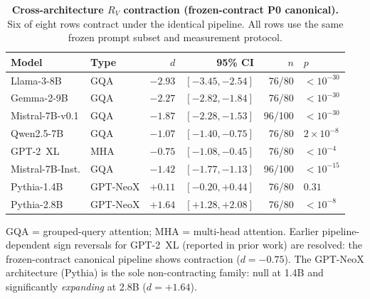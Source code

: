\documentclass{article}
\newcommand{\RV}{R_V}
\newcommand{\dcohen}{d}
\begin{document}
\begin{table}[ht]
\centering
\caption{\textbf{Cross-architecture $\RV$ contraction (frozen-contract P0 canonical).}
         Six of eight rows contract under the identical pipeline.
         All rows use the same frozen prompt subset and measurement protocol.}
\label{tab:crossarch}
\smallskip
\footnotesize
\begin{tabular}{llrrrl}
\toprule
\textbf{Model} & \textbf{Type} & \textbf{$\dcohen$} & \textbf{95\% CI} & \textbf{$n$} & \textbf{$p$} \\
\midrule
Llama-3-8B           & GQA  & $-2.93$ & $[-3.45, -2.54]$ & 76/80  & $< 10^{-30}$ \\
Gemma-2-9B           & GQA  & $-2.27$ & $[-2.82, -1.84]$ & 76/80  & $< 10^{-30}$ \\
Mistral-7B-v0.1      & GQA  & $-1.87$ & $[-2.28, -1.53]$ & 96/100 & $< 10^{-30}$ \\
Qwen2.5-7B           & GQA  & $-1.07$ & $[-1.40, -0.75]$ & 76/80  & $2 \times 10^{-8}$ \\
GPT-2~XL             & MHA  & $-0.75$ & $[-1.08, -0.45]$ & 76/80  & $< 10^{-4}$ \\
Mistral-7B-Inst.     & GQA  & $-1.42$ & $[-1.77, -1.13]$ & 96/100 & $< 10^{-15}$ \\
\midrule
Pythia-1.4B          & GPT-NeoX  & $+0.11$ & $[-0.20, +0.44]$ & 76/80  & $0.31$ \\
Pythia-2.8B          & GPT-NeoX  & $+1.64$ & $[+1.28, +2.08]$ & 76/80  & $< 10^{-8}$ \\
\bottomrule
\end{tabular}

\vspace{1mm}
\raggedright\footnotesize
GQA = grouped-query attention; MHA = multi-head attention.
Earlier pipeline-dependent sign reversals for GPT-2~XL (reported in prior work)
are resolved: the frozen-contract canonical pipeline shows contraction ($\dcohen = -0.75$).
The GPT-NeoX architecture (Pythia) is the sole non-contracting family:
null at 1.4B and significantly \emph{expanding} at 2.8B ($\dcohen = +1.64$).
\end{table}
\end{document}
